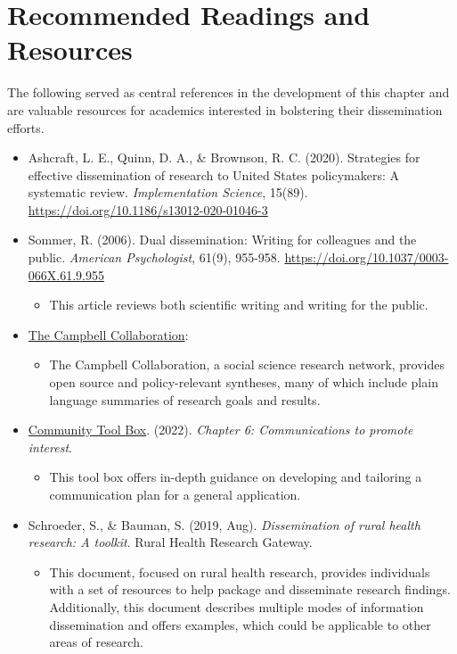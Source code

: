 \documentclass[
  11pt,
]{book}
\providecommand{\tightlist}{%
  \setlength{\itemsep}{0pt}\setlength{\parskip}{0pt}}
\begin{document}
\section{Recommended Readings and Resources}\label{recommended-readings-and-resources-2}

The following served as central references in the development of this chapter and are valuable resources for academics interested in bolstering their dissemination efforts.

\begin{itemize}
\tightlist
\item
  Ashcraft, L. E., Quinn, D. A., \& Brownson, R. C. (2020). Strategies for effective dissemination of research to United States policymakers: A systematic review. \emph{Implementation Science}, 15(89). \url{https://doi.org/10.1186/s13012-020-01046-3}
\item
  Sommer, R. (2006). Dual dissemination: Writing for colleagues and the public. \emph{American Psychologist}, 61(9), 955-958. \url{https://doi.org/10.1037/0003-066X.61.9.955}

  \begin{itemize}
  \tightlist
  \item
    This article reviews both scientific writing and writing for the public.
  \end{itemize}
\item
  \href{https://www.campbellcollaboration.org}{The Campbell Collaboration}:

  \begin{itemize}
  \tightlist
  \item
    The Campbell Collaboration, a social science research network, provides open source and policy-relevant syntheses, many of which include plain language summaries of research goals and results.
  \end{itemize}
\item
  \href{https://ctb.ku.edu/en/table-of-contents/participation/promoting-interest}{Community Tool Box}. (2022). \emph{Chapter 6: Communications to promote interest}.

  \begin{itemize}
  \tightlist
  \item
    This tool box offers in-depth guidance on developing and tailoring a communication plan for a general application.
  \end{itemize}
\item
  Schroeder, S., \& Bauman, S. (2019, Aug). \emph{Dissemination of rural health research: A toolkit}. Rural Health Research Gateway.

  \begin{itemize}
  \tightlist
  \item
    This document, focused on rural health research, provides individuals with a set of resources to help package and disseminate research findings. Additionally, this document describes multiple modes of information dissemination and offers examples, which could be applicable to other areas of research.
  \end{itemize}
\end{itemize}
\end{document}
